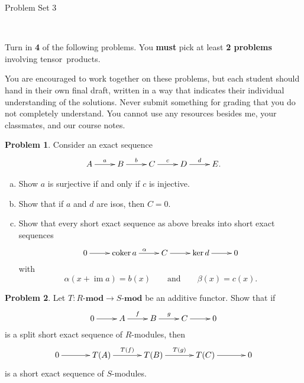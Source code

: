 \documentclass[11pt]{article}
\title{}
\date{\vspace{-0.5in}}
\DeclareMathOperator{\coker}{coker}
\DeclareMathOperator{\im}{im}
\theoremstyle{definition}
\newtheorem{problem}{Problem}
\begin{document}
\thispagestyle{fancy}
\pagestyle{fancy}

\vspace{3em}

\begin{center}
	{\LARGE Problem Set 3}
\end{center}


\


\noindent
Turn in {\bf 4} of the following problems. You {\bf must} pick at least {\bf 2 problems} involving tensor~products.

%
\noindent
You are encouraged to work together on these problems, but each student should hand in their own final draft, written in a way that indicates their individual understanding of the solutions. Never submit something for grading that you do not completely understand. You cannot use any resources besides me, your classmates, and our course notes.

\vspace{0.8em}

\begin{problem}
Consider an exact sequence
$$\xymatrix{A \ar[r]^-a & B \ar[r]^-b & C \ar[r]^-c & D \ar[r]^-d & E.}$$

\begin{enumerate}[a)]
	\item Show $a$ is surjective if and only if $c$ is injective.
\item Show that if $a$ and $d$ are isos, then $C = 0$.
\item Show that every short exact sequence as above
breaks into short exact sequences
$$\xymatrix{0 \ar[r] & \coker a \ar[r]^\alpha & C \ar[r] & \ker d \ar[r] & 0}$$
with
$$\alpha(x + \im a) = b(x) \qquad \textrm{and} \qquad \beta(x) = c(x).$$
\end{enumerate}
\end{problem}


\vspace{0.5em}

\begin{problem}
	Let $T\!: R\textbf{-mod} \longrightarrow S\textbf{-mod}$ be an additive functor. Show that if
	$$\xymatrix{0 \ar[r] & A \ar[r]^-f & B \ar[r]^-g & C \ar[r] & 0}$$
	is a split short exact sequence of $R$-modules, then 
	$$\xymatrix@C=12mm{0 \ar[r] & T(A) \ar[r]^-{T(f)} & T(B) \ar[r]^-{T(g)} & T(C) \ar[r] & 0}$$
is a short exact sequence of $S$-modules.
\end{problem}
\end{document}
